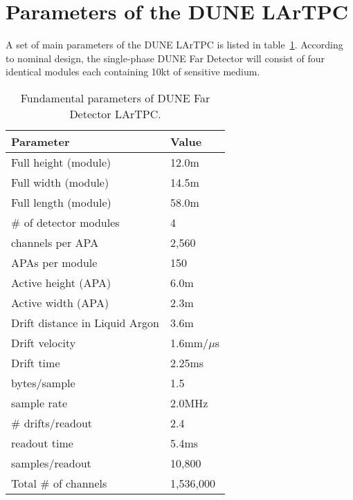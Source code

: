 \section{Parameters of the DUNE LArTPC}
A set of main parameters
of the DUNE LArTPC is listed in table~\ref{tab:duneparams}. According to nominal design,  the single-phase DUNE Far Detector
will consist of four identical modules each containing 10kt of sensitive medium.
\begin{table}[ht!]
	\centering
	\begin{tabular}{p{2in}p{1in}}
	Parameter & Value \\ \hline
Full height (module) & 12.0m \\ \hline
Full width (module) & 14.5m \\ \hline
Full length (module) & 58.0m \\ \hline
\# of detector modules & 4 \\ \hline
\hline
channels per APA & 2,560 \\ \hline
APAs per module & 150 \\ \hline
Active height (APA) & 6.0m \\ \hline
Active width (APA) & 2.3m \\ \hline  \hline
Drift distance in Liquid Argon & 3.6m \\
\hline
Drift velocity & 1.6mm/$\mu$s \\ \hline
Drift time & 2.25ms \\ \hline
\hline
bytes/sample & 1.5 \\ \hline
sample rate & 2.0MHz \\ \hline
\# drifts/readout & 2.4 \\ \hline
\hline
readout time & 5.4ms \\ \hline
samples/readout & 10,800 \\
\hline \hline
Total \# of channels & 1,536,000 \\
\hline
\end{tabular}
\caption{Fundamental parameters of DUNE Far Detector LArTPC.}
\label{tab:duneparams}
\end{table}

